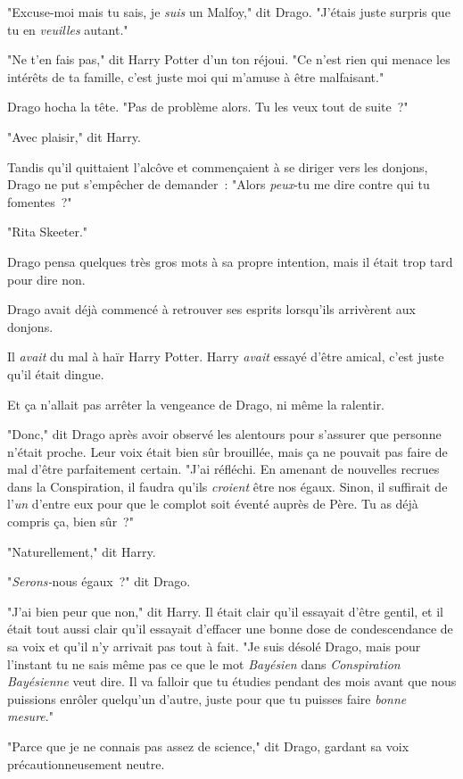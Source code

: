"Excuse-moi mais tu sais, je \emph{suis} un Malfoy," dit Drago. "J'étais juste surpris que tu en \emph{veuilles} autant."

"Ne t'en fais pas," dit Harry Potter d'un ton réjoui. "Ce n'est rien qui menace les intérêts de ta famille, c'est juste moi qui m'amuse à être malfaisant."

Drago hocha la tête. "Pas de problème alors. Tu les veux tout de suite~?"

"Avec plaisir," dit Harry.

Tandis qu'il quittaient l'alcôve et commençaient à se diriger vers les donjons, Drago ne put s'empêcher de demander~: "Alors \emph{peux}-tu me dire contre qui tu fomentes~?"

"Rita Skeeter."

Drago pensa quelques très gros mots à sa propre intention, mais il était trop tard pour dire non.

\later

Drago avait déjà commencé à retrouver ses esprits lorsqu'ils arrivèrent aux donjons.

Il \emph{avait} du mal à haïr Harry Potter. Harry \emph{avait} essayé d'être amical, c'est juste qu'il était dingue.

Et ça n'allait pas arrêter la vengeance de Drago, ni même la ralentir.

"Donc," dit Drago après avoir observé les alentours pour s'assurer que personne n'était proche. Leur voix était bien sûr brouillée, mais ça ne pouvait pas faire de mal d'être parfaitement certain. "J'ai réfléchi. En amenant de nouvelles recrues dans la Conspiration, il faudra qu'ils \emph{croient} être nos égaux. Sinon, il suffirait de l'\emph{un} d'entre eux pour que le complot soit éventé auprès de Père. Tu as déjà compris ça, bien sûr~?"

"Naturellement," dit Harry.

"\emph{Serons-}nous égaux~?" dit Drago.

"J'ai bien peur que non," dit Harry. Il était clair qu'il essayait d'être gentil, et il était tout aussi clair qu'il essayait d'effacer une bonne dose de condescendance de sa voix et qu'il n'y arrivait pas tout à fait. "Je suis désolé Drago, mais pour l'instant tu ne sais même pas ce que le mot \emph{Bayésien} dans \emph{Conspiration} \emph{Bayésienne} veut dire. Il va falloir que tu étudies pendant des mois avant que nous puissions enrôler quelqu'un d'autre, juste pour que tu puisses faire \emph{bonne mesure}."

"Parce que je ne connais pas assez de science," dit Drago, gardant sa voix précautionneusement neutre.

